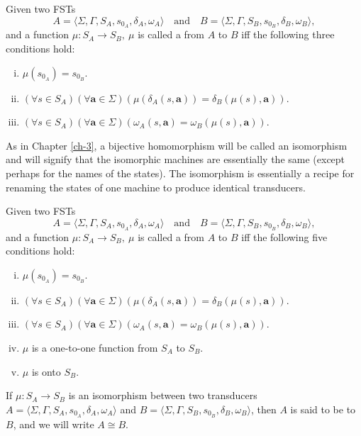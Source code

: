 \begin{dfn}\label{dfn-7.7}
Given two FSTs
\[ A=\langle\Sigma,\Gamma,S_A,s_{0_A},\delta_A,\omega_A\rangle\quad\text{and}
	\quad B=\langle\Sigma,\Gamma,S_B,s_{0_B},\delta_B,\omega_B\rangle, \]
and a function $\mu$$: S_A \rightarrow S_B,\ \mu$ is called a \emph{} from $A$ to $B$ iff the following three conditions hold:
\begin{enumerate}[i.]
\item $\mu(s_{0_A}) = s_{0_B}$.
\item $(\forall s \in S_A)(\forall\pmb{a} \in \Sigma)(\mu(\delta_A(s,\pmb{a}))
	= \delta_B(\mu(s),\pmb{a}))$.
\item $(\forall s \in S_A)(\forall\pmb{a} \in \Sigma)(\omega_A(s,\pmb{a}) =
	\omega_B(\mu(s),\pmb{a}))$.
\end{enumerate}
\end{dfn}

As in Chapter \ref{ch-3}, a bijective homomorphism will be called an isomorphism and will
signify that the isomorphic machines are essentially the same (except perhaps
for the names of the states). The isomorphism is essentially a recipe for
renaming the states of one machine to produce identical transducers.

\begin{dfn}\label{dfn-7.8}
Given two FSTs
\[ A=\langle\Sigma,\Gamma,S_A,s_{0_A},\delta_A,\omega_A\rangle\quad\text{and}
	\quad B=\langle\Sigma,\Gamma,S_B,s_{0_B},\delta_B,\omega_B\rangle, \]
and a function $\mu$$: S_A \rightarrow S_B,\ \mu$ is called a \emph{} from $A$ to $B$ iff the following five conditions hold:
\begin{enumerate}[i.]
\item $\mu(s_{0_A}) = s_{0_B}$.
\item $(\forall s \in S_A)(\forall\pmb{a} \in \Sigma)(\mu(\delta_A(s,\pmb{a}))
	= \delta_B(\mu(s),\pmb{a}))$.
\item $(\forall s \in S_A)(\forall\pmb{a} \in \Sigma)(\omega_A(s,\pmb{a}) =
	\omega_B(\mu(s),\pmb{a}))$.
\item $\mu$ is a one-to-one function from $S_A$ to $S_B$.
\item $\mu$ is onto $S_B$.
\end{enumerate}
\end{dfn}

\begin{dfn}\label{dfn-7.9}
If $\mu$$: S_A \rightarrow S_B$ is an isomorphism between two transducers
$A=\langle\Sigma,\Gamma,S_A,s_{0_A},\delta_A,\omega_A\rangle$ and
$B=\langle\Sigma,\Gamma,S_B,s_{0_B},\delta_B,\omega_B\rangle$, then $A$ is said
to be \emph{} to $B$, and we will write $A \cong B$.
\end{dfn}

